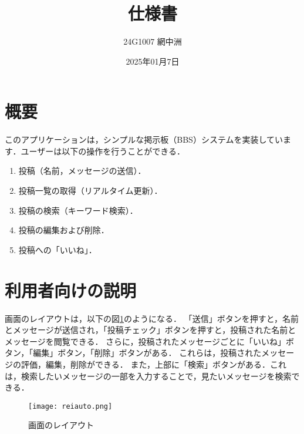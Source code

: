 \documentclass[uplatex,dvipdfmx]{jsarticle}
\begin{document}
\title{仕様書} %
\author{24G1007 網中洲}
\date{2025年01月7日}
\maketitle
\section{概要}
このアプリケーションは，シンプルな掲示板（BBS）システムを実装しています．ユーザーは以下の操作を行うことができる．
\begin{enumerate}
  \setlength{\leftskip}{0pt}
  \item[(1)]投稿（名前，メッセージの送信）．

  \item[(2)]投稿一覧の取得（リアルタイム更新）．
  \item[(3)]投稿の検索（キーワード検索）．
  
  \item[(4)]投稿の編集および削除．
  \item[(5)]投稿への「いいね」．
\end{enumerate}




\section{利用者向けの説明}
画面のレイアウトは，以下の図\ref{reiauto}のようになる．
「送信」ボタンを押すと，名前とメッセージが送信され，「投稿チェック」ボタンを押すと，投稿された名前とメッセージを閲覧できる．
さらに，投稿されたメッセージごとに「いいね」ボタン，「編集」ボタン，「削除」ボタンがある．
これらは，投稿されたメッセージの評価，編集，削除ができる．
また，上部に「検索」ボタンがある．これは，検索したいメッセージの一部を入力することで，見たいメッセージを検索できる．

\begin{figure}[H]
  \centering
      \texttt{[image: reiauto.png]}
      \caption{画面のレイアウト}
      \label{reiauto}
\end{figure}
\end{document}
